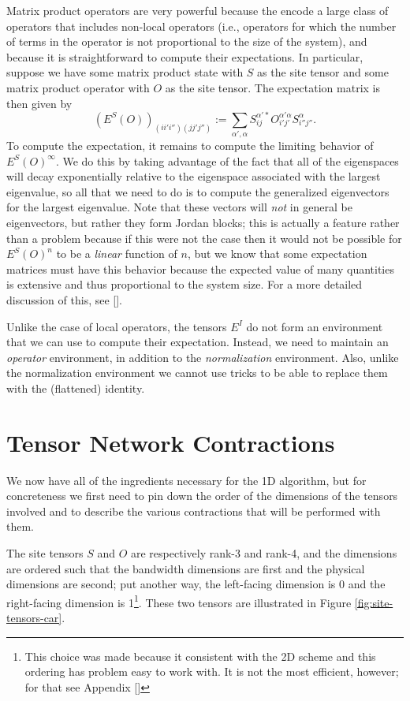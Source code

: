 \documentclass{article}
\begin{document}
Matrix product operators are very powerful because the encode a large class of operators that includes non-local operators (i.e., operators for which the number of terms in the operator is not proportional to the size of the system), and because it is straightforward to compute their expectations.  In particular, suppose we have some matrix product state with $S$ as the site tensor and some matrix product operator with $O$ as the site tensor.  The expectation matrix is then given by $$(E^S(O))_{(ii'i'')(jj'j'')} := \sum_{\alpha',\alpha} S^{\alpha'*}_{ij}O^{\alpha'\alpha}_{i'j'}S^{\alpha}_{i''j''}.$$  To compute the expectation, it remains to compute the limiting behavior of $E^S(O)^\infty$.  We do this by taking advantage of the fact that all of the eigenspaces will decay exponentially relative to the eigenspace associated with the largest eigenvalue, so all that we need to do is to compute the generalized eigenvectors for the largest eigenvalue.  Note that these vectors will \emph{not} in general be eigenvectors, but rather they form Jordan blocks;  this is actually a feature rather than a problem because if this were not the case then it would not be possible for $E^S(O)^n$ to be a \emph{linear} function of $n$, but we know that some expectation matrices must have this behavior because the expected value of many quantities is extensive and thus proportional to the system size.  For a more detailed discussion of this, see [].

Unlike the case of local operators, the tensors $E^I$ do not form an environment that we can use to compute their expectation.  Instead, we need to maintain an \emph{operator} environment, in addition to the \emph{normalization} environment.  Also, unlike the normalization environment we cannot use tricks to be able to replace them with the (flattened) identity.

\section{Tensor Network Contractions}
\label{1d-contractions}

We now have all of the ingredients necessary for the 1D algorithm, but for concreteness we first need to pin down the order of the dimensions of the tensors involved and to describe the various contractions that will be performed with them.

The site tensors $S$ and $O$ are respectively rank-3 and rank-4, and the dimensions are ordered such that the bandwidth dimensions are first and the physical dimensions are second; put another way, the left-facing dimension is 0 and the right-facing dimension is 1\footnote{This choice was made because it consistent with the 2D scheme and this ordering has problem easy to work with.  It is not the most efficient, however;  for that see Appendix []}.  These two tensors are illustrated in Figure \ref{fig:site-tensors-car}.
\end{document}
